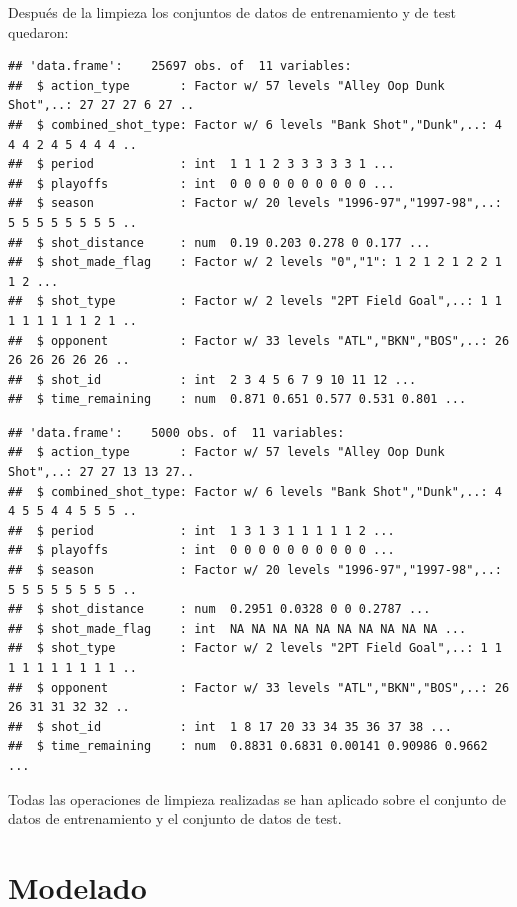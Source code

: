 \documentclass[
]{article}
\begin{document}
Después de la limpieza los conjuntos de datos de entrenamiento y de test
quedaron:

\begin{verbatim}
## 'data.frame':    25697 obs. of  11 variables:
##  $ action_type       : Factor w/ 57 levels "Alley Oop Dunk Shot",..: 27 27 27 6 27 ..
##  $ combined_shot_type: Factor w/ 6 levels "Bank Shot","Dunk",..: 4 4 4 2 4 5 4 4 4 ..
##  $ period            : int  1 1 1 2 3 3 3 3 3 1 ...
##  $ playoffs          : int  0 0 0 0 0 0 0 0 0 0 ...
##  $ season            : Factor w/ 20 levels "1996-97","1997-98",..: 5 5 5 5 5 5 5 5 ..
##  $ shot_distance     : num  0.19 0.203 0.278 0 0.177 ...
##  $ shot_made_flag    : Factor w/ 2 levels "0","1": 1 2 1 2 1 2 2 1 1 2 ...
##  $ shot_type         : Factor w/ 2 levels "2PT Field Goal",..: 1 1 1 1 1 1 1 1 2 1 ..
##  $ opponent          : Factor w/ 33 levels "ATL","BKN","BOS",..: 26 26 26 26 26 26 ..
##  $ shot_id           : int  2 3 4 5 6 7 9 10 11 12 ...
##  $ time_remaining    : num  0.871 0.651 0.577 0.531 0.801 ...
\end{verbatim}

\begin{verbatim}
## 'data.frame':    5000 obs. of  11 variables:
##  $ action_type       : Factor w/ 57 levels "Alley Oop Dunk Shot",..: 27 27 13 13 27..
##  $ combined_shot_type: Factor w/ 6 levels "Bank Shot","Dunk",..: 4 4 5 5 4 4 5 5 5 ..
##  $ period            : int  1 3 1 3 1 1 1 1 1 2 ...
##  $ playoffs          : int  0 0 0 0 0 0 0 0 0 0 ...
##  $ season            : Factor w/ 20 levels "1996-97","1997-98",..: 5 5 5 5 5 5 5 5 ..
##  $ shot_distance     : num  0.2951 0.0328 0 0 0.2787 ...
##  $ shot_made_flag    : int  NA NA NA NA NA NA NA NA NA NA ...
##  $ shot_type         : Factor w/ 2 levels "2PT Field Goal",..: 1 1 1 1 1 1 1 1 1 1 ..
##  $ opponent          : Factor w/ 33 levels "ATL","BKN","BOS",..: 26 26 31 31 32 32 ..
##  $ shot_id           : int  1 8 17 20 33 34 35 36 37 38 ...
##  $ time_remaining    : num  0.8831 0.6831 0.00141 0.90986 0.9662 ...
\end{verbatim}

Todas las operaciones de limpieza realizadas se han aplicado sobre el
conjunto de datos de entrenamiento y el conjunto de datos de test.

\hypertarget{modelado}{%
\section{\texorpdfstring{\textbf{Modelado}}{Modelado}}\label{modelado}}
\end{document}
